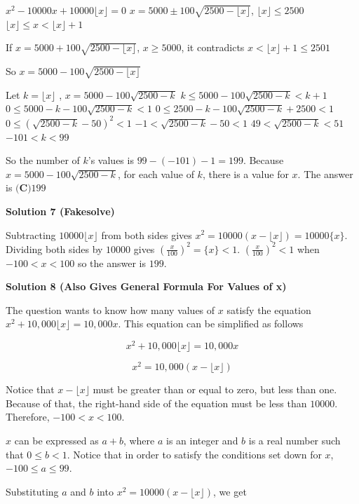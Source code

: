 \begin{enumerate}
$x^2 - 10000x + 10000 \lfloor x \rfloor =0$
$x=5000 \pm 100 \sqrt{2500- \lfloor x \rfloor}$, $\lfloor x \rfloor \le 2500$
$\lfloor x \rfloor \le x < \lfloor x \rfloor + 1$

 If $x= 5000 + 100 \sqrt{2500 - \lfloor x \rfloor}$, $x \ge 5000$, it contradicts $x < \lfloor x \rfloor + 1 \le 2501$

 So $x= 5000 - 100 \sqrt{2500 - \lfloor x \rfloor}$

 Let $k = \lfloor x \rfloor$ , $x= 5000 - 100 \sqrt{2500 - k}$
$k \le 5000 - 100 \sqrt{2500 - k} < k + 1$
$0 \le 5000 - k - 100 \sqrt{2500 - k} < 1$
$0 \le 2500 - k - 100 \sqrt{2500 - k} + 2500 < 1$
$0 \le (\sqrt{2500 - k} - 50)^2 < 1$
$-1 < \sqrt{2500 - k} - 50 < 1$
$49 < \sqrt{2500 - k} < 51$
$-101 < k < 99$

 So the number of $k$'s values is $99-(-101)-1=199$. Because $x=5000-100\sqrt{2500-k}$, for each value of $k$, there is a value for $x$. The answer is $\boxed{\textbf{(C)} 199}$




\textbf{Solution 7 (Fakesolve)}

Subtracting $10000\lfloor x\rfloor$ from both sides gives $x^2=10000(x-\lfloor x\rfloor)=10000\{x\}$. Dividing both sides by $10000$ gives $\left(\frac{x}{100}\right)^2=\{x\}<1$.  $\left(\frac{x}{100}\right)^2<1$ when $-100<x<100$ so the answer is $\boxed{199}$.

 



\textbf{Solution 8 (Also Gives General Formula For Values of x)}

The question wants to know how many values of $x$ satisfy the equation $x^2 + 10,000\lfloor x \rfloor = 10,000x$. This equation can be simplified as follows

 
 \[x^2 + 10,000\lfloor x \rfloor = 10,000x\]

 \[x^2 = 10,000(x-\lfloor x \rfloor)\]

 Notice that $x-\lfloor x \rfloor$ must be greater than or equal to zero, but less than one. Because of that, the right-hand side of the equation must be less than $10000$. Therefore, $-100<x<100$.

 $x$ can be expressed as $a+b$, where $a$ is an integer and $b$ is a real number such that $0 \leq b < 1$. Notice that in order to satisfy the conditions set down for $x$, $-100 \leq a \leq 99$.

 Substituting $a$ and $b$ into $x^2 = 10000(x-\lfloor x \rfloor)$, we get


\end{enumerate}
